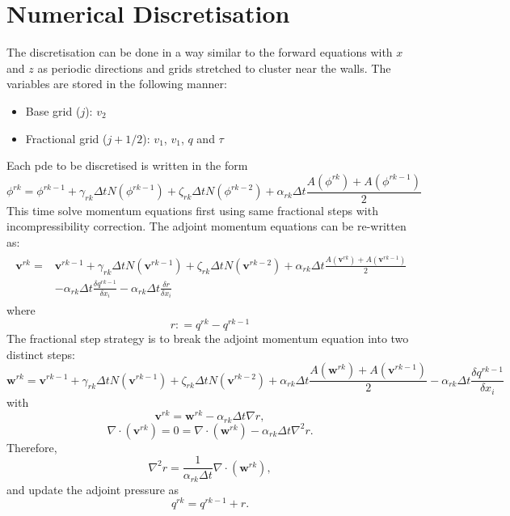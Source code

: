 \documentclass[preprint,12pt]{article}
\begin{document}
\section{Numerical Discretisation}
The discretisation can be done in a way similar to the forward equations with $x$ and $z$ as periodic directions and grids stretched to cluster near the walls. The variables are stored in the following manner:
\begin{itemize}
	\item Base grid ($j$): $v_2$
	\item Fractional grid ($j+1/2$): $v_1$, $v_1$, $q$ and $\tau$ 
\end{itemize}
Each pde to be discretised is written in the form
\begin{equation}
\phi^{rk}=\phi^{rk-1}+\gamma_{rk}\Delta t N(\phi^{rk-1})+\zeta_{rk}\Delta t N(\phi^{rk-2})+\alpha_{rk}\Delta t\frac{A(\phi^{rk})+A(\phi^{rk-1})}{2}
\end{equation}
This time solve momentum equations first using same fractional steps with incompressibility correction.
The adjoint momentum equations can be re-written as:
\begin{align}
\begin{split}
\mathbf{v}^{rk}=&\mathbf{v}^{rk-1}+\gamma_{rk}\Delta t N(\mathbf{v}^{rk-1})+\zeta_{rk}\Delta t N(\mathbf{v}^{rk-2})+\alpha_{rk}\Delta t\frac{A(\mathbf{v}^{rk})+A(\mathbf{v}^{rk-1})}{2}\\&-\alpha_{rk}\Delta t\frac{\delta q^{rk-1}}{\delta x_i}-\alpha_{rk}\Delta t\frac{\delta r}{\delta x_i}
\end{split}
\end{align} 
where 
\begin{equation}
r\mathrel{\mathop:}= q^{rk}-q^{rk-1}
\end{equation}
The fractional step strategy is to break the adjoint momentum equation into two distinct steps:
\begin{equation}
\mathbf{w}^{rk}=\mathbf{v}^{rk-1}+\gamma_{rk}\Delta t N(\mathbf{v}^{rk-1})+\zeta_{rk}\Delta t N(\mathbf{v}^{rk-2})+\alpha_{rk}\Delta t\frac{A(\mathbf{w}^{rk})+A(\mathbf{v}^{rk-1})}{2}-\alpha_{rk}\Delta t\frac{\delta q^{rk-1}}{\delta x_i}
\end{equation} 
with 
\begin{equation}
\mathbf{v}^{rk}=\mathbf{w}^{rk}-\alpha_{rk}\Delta t \nabla r,
\end{equation}
\begin{equation}
\nabla\cdot(\mathbf{v}^{rk})=0=\nabla\cdot(\mathbf{w}^{rk})-\alpha_{rk}\Delta t \nabla ^2 r.
\end{equation}
Therefore,
\begin{equation}
\nabla ^2 r=\frac{1}{\alpha_{rk}\Delta t}\nabla\cdot(\mathbf{w}^{rk}),
\end{equation}
and update the adjoint pressure as
\begin{equation}
q^{rk}=q^{rk-1}+r.
\end{equation}
\end{document}
